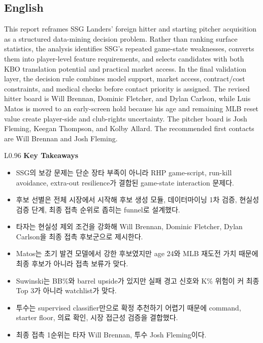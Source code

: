 \documentclass[11pt,a4paper]{article}
\newcommand{\tight}{\setlength{\itemsep}{0.25em}\setlength{\parskip}{0pt}}
\begin{document}
\subsection*{English}
This report reframes SSG Landers' foreign hitter and starting pitcher acquisition as a structured data-mining decision problem. Rather than ranking surface statistics, the analysis identifies SSG's repeated game-state weaknesses, converts them into player-level feature requirements, and selects candidates with both KBO translation potential and practical market access. In the final validation layer, the decision rule combines model support, market access, contract/cost constraints, and medical checks before contact priority is assigned. The revised hitter board is Will Brennan, Dominic Fletcher, and Dylan Carlson, while Luis Matos is moved to an early-screen hold because his age and remaining MLB reset value create player-side and club-rights uncertainty. The pitcher board is Josh Fleming, Keegan Thompson, and Kolby Allard. The recommended first contacts are Will Brennan and Josh Fleming.

\begin{center}
\begin{minipage}{0.90\linewidth}
\begin{tabularx}{\linewidth}{L{0.96\linewidth}}
\textbf{Key Takeaways} \\
\begin{itemize}\tight
    \item SSG의 보강 문제는 단순 장타 부족이 아니라 RHP game-script, run-kill avoidance, extra-out resilience가 결합된 game-state interaction 문제다.
    \item 후보 선별은 전체 시장에서 시작해 후보 생성 모듈, 데이터마이닝 1차 검증, 현실성 검증 단계, 최종 접촉 순위로 좁히는 funnel로 설계했다.
    \item 타자는 현실성 제외 조건을 강화해 Will Brennan, Dominic Fletcher, Dylan Carlson을 최종 접촉 후보군으로 제시한다.
    \item Matos는 초기 발견 모델에서 강한 후보였지만 age 24와 MLB 재도전 가치 때문에 최종 후보가 아니라 접촉 보류가 맞다.
    \item Suwinski는 BB\%와 barrel upside가 있지만 실패 경고 신호와 K\% 위험이 커 최종 Top 3가 아니라 watchlist가 맞다.
    \item 투수는 supervised classifier만으로 확정 추천하기 어렵기 때문에 command, starter floor, 의료 확인, 시장 접근성 검증을 결합했다.
    \item 최종 접촉 1순위는 타자 Will Brennan, 투수 Josh Fleming이다.
\end{itemize}
\end{tabularx}
\end{minipage}
\end{center}
\end{document}
